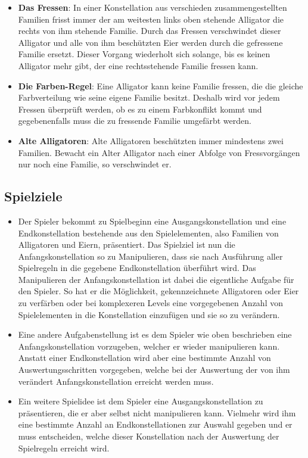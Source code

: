 	\begin{itemize}
	
	\item \textbf{Das Fressen}: In einer Konstellation aus verschieden zusammengestellten Familien frisst immer der am weitesten links oben stehende Alligator die rechts von ihm stehende Familie. Durch das Fressen verschwindet dieser Alligator und alle von ihm beschützten Eier werden durch die gefressene Familie ersetzt. Dieser Vorgang wiederholt sich solange, bis es keinen Alligator mehr gibt, der eine rechtsstehende Familie fressen kann.
	
	\item \textbf{Die Farben-Regel}: Eine Alligator kann keine Familie fressen, die die gleiche Farbverteilung wie seine eigene Familie besitzt.  Deshalb wird vor jedem Fressen überprüft werden, ob es zu einem Farbkonflikt kommt und gegebenenfalls muss die zu fressende Familie umgefärbt werden.
	
	\item \textbf{Alte Alligatoren}: Alte Alligatoren beschützten immer mindestens zwei Familien. Bewacht ein Alter Alligator nach einer Abfolge von Fressvorgängen nur noch eine Familie, so verschwindet er.
	
	\end{itemize}	
	
\subsection{Spielziele}
	
	\begin{itemize}
	
		\item Der Spieler bekommt zu Spielbeginn eine Ausgangskonstellation und eine Endkonstellation bestehende aus den Spielelementen, also Familien von Alligatoren und Eiern, präsentiert. Das Spielziel ist nun die Anfangskonstellation so zu Manipulieren, dass sie nach Ausführung aller Spielregeln in die gegebene Endkonstellation überführt wird. Das Manipulieren der Anfangskonstellation ist dabei die eigentliche Aufgabe für den Spieler. So hat er die Möglichkeit, gekennzeichnete Alligatoren oder Eier zu verfärben oder bei komplexeren Levels eine vorgegebenen Anzahl von Spielelementen in die Konstellation einzufügen und sie so zu verändern.
		
		\item Eine andere Aufgabenstellung ist es dem Spieler wie oben beschrieben eine Anfangskonstellation vorzugeben, welcher er wieder manipulieren kann. Anstatt einer Endkonstellation wird aber eine bestimmte Anzahl von Auswertungsschritten vorgegeben, welche bei der Auswertung der von ihm verändert Anfangskonstellation erreicht werden muss.
		
		\item Ein weitere Spielidee ist dem Spieler eine Ausgangskonstellation zu präsentieren, die er aber selbst nicht manipulieren kann. Vielmehr wird ihm eine bestimmte Anzahl an Endkonstellationen
zur Auswahl gegeben und er muss entscheiden, welche dieser Konstellation nach der Auswertung der Spielregeln erreicht wird.
		
	\end{itemize}

	